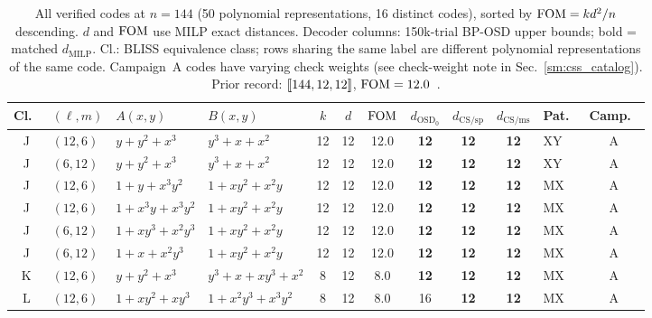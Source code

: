 
\begin{table}[t]
\centering
\caption{All verified codes at $n = 144$ (50 polynomial representations, 16 distinct codes), sorted by $\mathrm{FOM} = kd^2/n$ descending.
$d$ and $\mathrm{FOM}$ use MILP exact distances.
Decoder columns: 150k-trial BP-OSD upper bounds; bold = matched $d_{\text{MILP}}$.
Cl.: BLISS equivalence class; rows sharing the same label are different polynomial representations of the same code.
Campaign~A codes have varying check weights (see check-weight note in Sec.~\ref{sm:css_catalog}).
Prior record: $\lbrack\!\lbrack 144,12,12 \rbrack\!\rbrack$, $\mathrm{FOM} = 12.0$~\protect\cite{bravyi2024high}.}
\label{tab:cat144}
\scriptsize
\begin{tabular*}{\textwidth}{@{\extracolsep{\fill}}clllcccccclc}
\toprule
Cl.\ & $(\ell,m)$ & $A(x,y)$ & $B(x,y)$ & $k$ & $d$ & $\mathrm{FOM}$ & $d_{\text{OSD}_0}$ & $d_{\text{CS/sp}}$ & $d_{\text{CS/ms}}$ & Pat.\ & Camp.\ \\
\midrule
J & $(12,6)$ & $y{+}y^{2}{+}x^{3}$ & $y^{3}{+}x{+}x^{2}$ & 12 & 12 & 12.0 & \textbf{12} & \textbf{12} & \textbf{12} & XY & A \\
J & $(6,12)$ & $y{+}y^{2}{+}x^{3}$ & $y^{3}{+}x{+}x^{2}$ & 12 & 12 & 12.0 & \textbf{12} & \textbf{12} & \textbf{12} & XY & A \\
J & $(12,6)$ & $1{+}y{+}x^{3}y^{2}$ & $1{+}xy^{2}{+}x^{2}y$ & 12 & 12 & 12.0 & \textbf{12} & \textbf{12} & \textbf{12} & MX & A \\
J & $(12,6)$ & $1{+}x^{3}y{+}x^{3}y^{2}$ & $1{+}xy^{2}{+}x^{2}y$ & 12 & 12 & 12.0 & \textbf{12} & \textbf{12} & \textbf{12} & MX & A \\
J & $(6,12)$ & $1{+}xy^{3}{+}x^{2}y^{3}$ & $1{+}xy^{2}{+}x^{2}y$ & 12 & 12 & 12.0 & \textbf{12} & \textbf{12} & \textbf{12} & MX & A \\
J & $(6,12)$ & $1{+}x{+}x^{2}y^{3}$ & $1{+}xy^{2}{+}x^{2}y$ & 12 & 12 & 12.0 & \textbf{12} & \textbf{12} & \textbf{12} & MX & A \\
K & $(12,6)$ & $y{+}y^{2}{+}x^{3}$ & $y^{3}{+}x{+}xy^{3}{+}x^{2}$ & 8 & 12 & 8.0 & \textbf{12} & \textbf{12} & \textbf{12} & MX & A \\
L & $(12,6)$ & $1{+}xy^{2}{+}xy^{3}$ & $1{+}x^{2}y^{3}{+}x^{3}y^{2}$ & 8 & 12 & 8.0 & 16 & \textbf{12} & \textbf{12} & MX & A \\

\end{tabular*}
\end{table}
